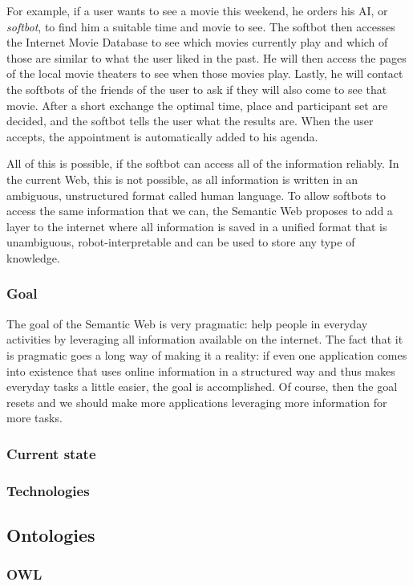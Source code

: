 \documentclass{article}
\begin{document}
For example, if a user wants to see a movie this weekend, he orders his AI, or \textit{softbot}, to find him a suitable time and movie to see. The softbot then accesses the Internet Movie Database to see which movies currently play and which of those are similar to what the user liked in the past. He will then access the pages of the local movie theaters to see when those movies play. Lastly, he will contact the softbots of the friends of the user to ask if they will also come to see that movie. After a short exchange the optimal time, place and participant set are decided, and the softbot tells the user what the results are. When the user accepts, the appointment is automatically added to his agenda. %

All of this is possible, if the softbot can access all of the information reliably. In the current Web, this is not possible, as all information is written in an ambiguous, unstructured format called human language. To allow softbots to access the same information that we can, the Semantic Web proposes to add a layer to the internet where all information is saved in a unified format that is unambiguous, robot-interpretable and can be used to store any type of knowledge.
 
 \subsubsection{Goal}
 The goal of the Semantic Web is very pragmatic: help people in everyday activities by leveraging all information available on the internet. The fact that it is pragmatic goes a long way of making it a reality: if even one application comes into existence that uses online information in a structured way and thus makes everyday tasks a little easier, the goal is accomplished. Of course, then the goal resets and we should make more applications leveraging more information for more tasks.
 \subsubsection{Current state}
 
 \subsubsection{Technologies}
 \subsection{Ontologies}
 \subsubsection{OWL}
\end{document}
